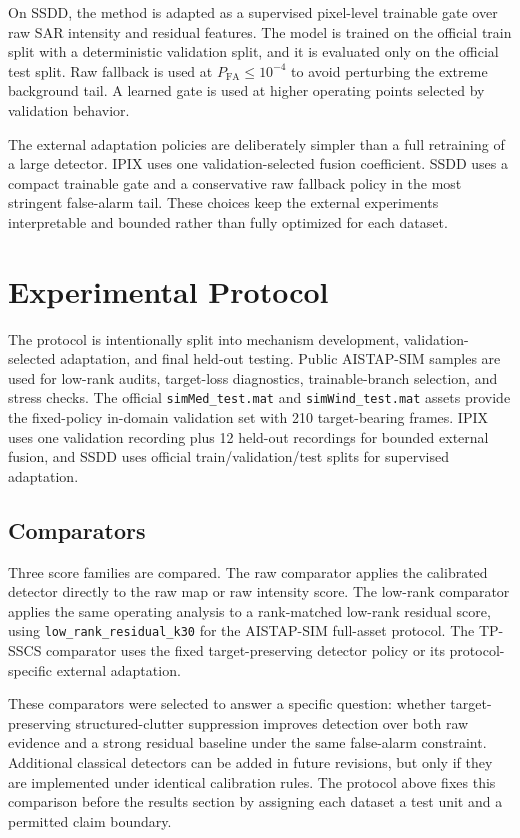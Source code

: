 \documentclass[journal]{IEEEtran}
\begin{document}
On SSDD, the method is adapted as a supervised pixel-level trainable gate over raw SAR intensity and residual features. The model is trained on the official train split with a deterministic validation split, and it is evaluated only on the official test split. Raw fallback is used at $P_{\mathrm{FA}} \leq 10^{-4}$ to avoid perturbing the extreme background tail. A learned gate is used at higher operating points selected by validation behavior.

The external adaptation policies are deliberately simpler than a full retraining of a large detector. IPIX uses one validation-selected fusion coefficient. SSDD uses a compact trainable gate and a conservative raw fallback policy in the most stringent false-alarm tail. These choices keep the external experiments interpretable and bounded rather than fully optimized for each dataset.

\section{Experimental Protocol}

The protocol is intentionally split into mechanism development, validation-selected adaptation, and final held-out testing. Public AISTAP-SIM samples are used for low-rank audits, target-loss diagnostics, trainable-branch selection, and stress checks. The official \texttt{simMed\_test.mat} and \texttt{simWind\_test.mat} assets provide the fixed-policy in-domain validation set with 210 target-bearing frames. IPIX uses one validation recording plus 12 held-out recordings for bounded external fusion, and SSDD uses official train/validation/test splits for supervised adaptation.

\subsection{Comparators}

Three score families are compared. The raw comparator applies the calibrated detector directly to the raw map or raw intensity score. The low-rank comparator applies the same operating analysis to a rank-matched low-rank residual score, using \texttt{low\_rank\_residual\_k30} for the AISTAP-SIM full-asset protocol. The TP-SSCS comparator uses the fixed target-preserving detector policy or its protocol-specific external adaptation.

These comparators were selected to answer a specific question: whether target-preserving structured-clutter suppression improves detection over both raw evidence and a strong residual baseline under the same false-alarm constraint. Additional classical detectors can be added in future revisions, but only if they are implemented under identical calibration rules. The protocol above fixes this comparison before the results section by assigning each dataset a test unit and a permitted claim boundary.
\end{document}
